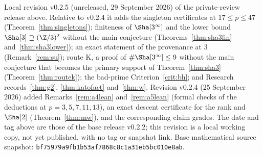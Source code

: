 \par\noindent\small Local revision v0.2.5 (unreleased, 29 September 2026) of the private-review release above. Relative to v0.2.4 it adds the singleton certificates at $17\le p\le47$ (Theorem~\ref{thm:singletons}); finiteness of $\Sha[3^\infty]$ and the lower bound $\Sha[3]\supseteq(\Z/3)^2$ without the main conjecture (Theorems~\ref{thm:sha3fin} and~\ref{thm:sha3lower}); an exact statement of the provenance at $3$ (Remark~\ref{rem:su}); route K, a proof of $\#\Sha[3^\infty]\le9$ without the main conjecture that becomes the primary support of Theorem~\ref{thm:sha3} (Theorem~\ref{thm:routek}); the bad-prime Criterion~\ref{crit:bh}; and Research records~\ref{thm:g2}, \ref{thm:katofact} and~\ref{thm:w}. Revision v0.2.4 (25 September 2026) added Remarks~\ref{rem:a4lean} and~\ref{rem:a5lean} (formal checks of the deductions at $p=3,5,7,11,13$), an exact descent certificate for the rank and $\Sha[2]$ (Theorem~\ref{thm:mw}), and the corresponding claim grades. The date and tag above are those of the base release v0.2.2; this revision is a local working copy, not yet published, with no tag or snapshot link. Base mathematical source snapshot: \nolinkurl{bf75979a9fb1b53af7868c8c1a31eb5bc010e8ab}.\normalsize
